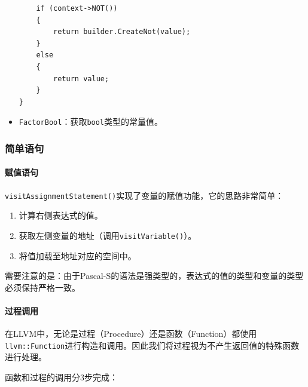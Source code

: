 \documentclass[lang=cn,11pt,a4paper,cite=authornum]{paper}
\begin{document}
\begin{itemize}
\begin{code}
\begin{verbatim}
    if (context->NOT())
    {
        return builder.CreateNot(value);
    }
    else
    {
        return value;
    }
}
    \end{verbatim}
    \end{code}
    \item \texttt{FactorBool}：获取\texttt{bool}类型的常量值。
\end{itemize}

\subsubsection{简单语句}

\paragraph{赋值语句}

\texttt{visitAssignmentStatement()}实现了变量的赋值功能，它的思路非常简单：

\begin{enumerate}
    \item 计算右侧表达式的值。
    \item 获取左侧变量的地址（调用\texttt{visitVariable()}）。
    \item 将值加载至地址对应的空间中。
\end{enumerate}

需要注意的是：由于Pascal-S的语法是强类型的，表达式的值的类型和变量的类型必须保持严格一致。

\paragraph{过程调用} \label{proccall}

在LLVM中，无论是过程（Procedure）还是函数（Function）都使用\texttt{llvm::Function}进行构造和调用。因此我们将过程视为不产生返回值的特殊函数进行处理。

函数和过程的调用分3步完成：
\end{document}
